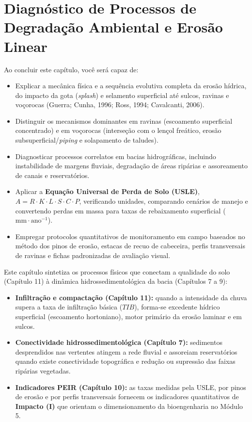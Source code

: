 \chapter{Diagnóstico de Processos de Degradação Ambiental e Erosão Linear}
\label{cap:degradacao_erosao_linear}

\noindent\tagPratica
\vspace{4pt}

\begin{capObjetivos}
Ao concluir este capítulo, você será capaz de:
\begin{itemize}[leftmargin=1.5em, itemsep=2.5pt]
  \item Explicar a mecânica física e a sequência evolutiva completa da erosão hídrica, do impacto da gota (\textit{splash}) e selamento superficial até sulcos, ravinas e voçorocas (Guerra; Cunha, 1996; Ross, 1994; Cavalcanti, 2006).
  \item Distinguir os mecanismos dominantes em ravinas (escoamento superficial concentrado) e em voçorocas (interseção com o lençol freático, erosão subsuperficial/\textit{piping} e solapamento de taludes).
  \item Diagnosticar processos correlatos em bacias hidrográficas, incluindo instabilidade de margens fluviais, degradação de áreas ripárias e assoreamento de canais e reservatórios.
  \item Aplicar a \textbf{Equação Universal de Perda de Solo (USLE)}, $A = R \cdot K \cdot L \cdot S \cdot C \cdot P$, verificando unidades, comparando cenários de manejo e convertendo perdas em massa para taxas de rebaixamento superficial ($\text{mm}\cdot\text{ano}^{-1}$).
  \item Empregar protocolos quantitativos de monitoramento em campo baseados no método dos pinos de erosão, estacas de recuo de cabeceira, perfis transversais de ravinas e fichas padronizadas de avaliação visual.
\end{itemize}
\end{capObjetivos}

\begin{capRevisao}
Este capítulo sintetiza os processos físicos que conectam a qualidade do solo (Capítulo 11) à dinâmica hidrossedimentológica da bacia (Capítulos 7 a 9):
\begin{itemize}[leftmargin=1.5em, itemsep=2.5pt]
  \item \textbf{Infiltração e compactação (Capítulo 11):} quando a intensidade da chuva supera a taxa de infiltração básica ($TIB$), forma-se excedente hídrico superficial (escoamento hortoniano), motor primário da erosão laminar e em sulcos.
  \item \textbf{Conectividade hidrossedimentológica (Capítulo 7):} sedimentos desprendidos nas vertentes atingem a rede fluvial e assoreiam reservatórios quando existe conectividade topográfica e redução ou supressão das faixas ripárias vegetadas.
  \item \textbf{Indicadores PEIR (Capítulo 10):} as taxas medidas pela USLE, por pinos de erosão e por perfis transversais fornecem os indicadores quantitativos de \textbf{Impacto (I)} que orientam o dimensionamento da bioengenharia no Módulo 5.
\end{itemize}
\end{capRevisao}

